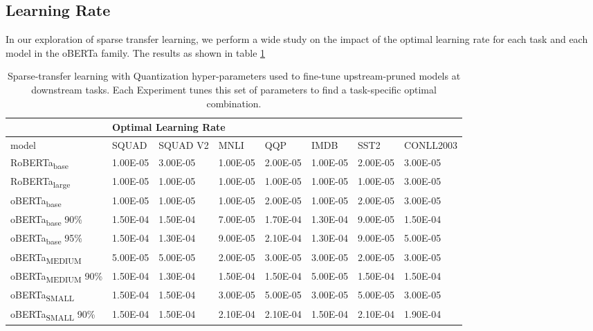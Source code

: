 \subsection{Learning Rate}
\label{sec:sparse-transfer-learning-rate}
In our exploration of sparse transfer learning, we perform a wide study on the impact of the optimal learning rate for each task and each model in the oBERTa family. The results as shown in table \ref{tab:learning-rate}
\begin{table}
      \centering
        {\small 
        \begin{tabular}{|l|l|l|l|l|l|l|l|}
    \hline
         & \multicolumn{7}{l}{Optimal Learning Rate} \\ \hline
        model & SQUAD & SQUAD V2 & MNLI & QQP & IMDB & SST2 & CONLL2003 \\ \hline
        RoBERTa\textsubscript{base}& 1.00E-05 & 3.00E-05 & 1.00E-05 & 2.00E-05 & 1.00E-05 & 2.00E-05 & 3.00E-05 \\ \hline
        RoBERTa\textsubscript{large} & 1.00E-05 & 1.00E-05 & 1.00E-05 & 1.00E-05 & 1.00E-05 & 1.00E-05 & 3.00E-05 \\ \hline
        oBERTa\textsubscript{base}& 1.00E-05 & 1.00E-05 & 1.00E-05 & 2.00E-05 & 1.00E-05 & 2.00E-05 & 3.00E-05 \\ \hline
        oBERTa\textsubscript{base} 90\% & 1.50E-04 & 1.50E-04 & 7.00E-05 & 1.70E-04 & 1.30E-04 & 9.00E-05 & 1.50E-04 \\ \hline
        oBERTa\textsubscript{base} 95\% & 1.50E-04 & 1.30E-04 & 9.00E-05 & 2.10E-04 & 1.30E-04 & 9.00E-05 & 5.00E-05 \\ \hline
        oBERTa\textsubscript{MEDIUM} & 5.00E-05 & 5.00E-05 & 2.00E-05 & 3.00E-05 & 3.00E-05 & 2.00E-05 & 3.00E-05 \\ \hline
        oBERTa\textsubscript{MEDIUM} 90\%   & 1.50E-04 & 1.30E-04 & 1.50E-04 & 1.50E-04 & 5.00E-05 & 1.50E-04 & 1.50E-04 \\ \hline
        oBERTa\textsubscript{SMALL} & 1.50E-04 & 1.50E-04 & 3.00E-05 & 5.00E-05 & 3.00E-05 & 5.00E-05 & 3.00E-05 \\ \hline
        oBERTa\textsubscript{SMALL} 90\% & 1.50E-04 & 1.50E-04 & 2.10E-04 & 2.10E-04 & 1.50E-04 & 2.10E-04 & 1.90E-04 \\ \hline
    \end{tabular}    
        }
        \caption{Sparse-transfer learning with Quantization hyper-parameters used to fine-tune upstream-pruned models at downstream tasks. Each Experiment tunes this set of parameters to find a task-specific optimal combination.}
    \label{tab:learning-rate}
\end{table}
